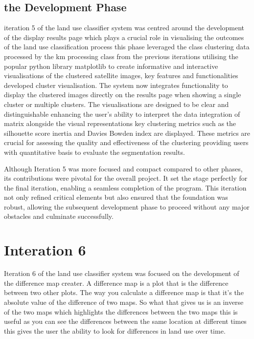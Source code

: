 \subsection{the Development Phase}\label{subsec:development-phase4}

iteration 5 of the land use classifier system was centred around the development of the display results page which plays a crucial role in visualising the outcomes of the land use classification process this phase leveraged the class clustering data processed by the km processing class from the previous iterations utilising the popular python library matplotlib to create
informative and interactive visualisations of the clustered satellite images, key features and functionalities developed cluster visualisation.
The system now integrates functionality to display the clustered images directly on the results page when showing a single cluster or multiple clusters.
The visualisations are designed to be clear and distinguishable enhancing the user's ability to interpret the data integration of matrix alongside the visual representations key clustering metrics such as the silhouette score inertia and Davies Bowden index are displayed.
These metrics are crucial for assessing the quality and effectiveness of the clustering providing users with quantitative basis to evaluate the segmentation results.

Although Iteration 5 was more focused and compact compared to other phases, its contributions were pivotal for the overall project.
It set the stage perfectly for the final iteration, enabling a seamless completion of the program.
This iteration not only refined critical elements but also ensured that the foundation was robust,
allowing the subsequent development phase to proceed without any major obstacles and culminate successfully.


\section{Interation 6}\label{sec:interation-6}

Iteration 6 of the land use classifier system was focused on the development of the difference map creater.
A difference map is a plot that is the difference between two other plots.
The way you calculate a difference map is that it's the absolute value of the difference of two maps.
So what that gives us is an inverse of the two maps which highlights the differences between the two maps this is useful as you can see the differences between the same location at different times this gives the user the ability to look for differences in land use over time.

